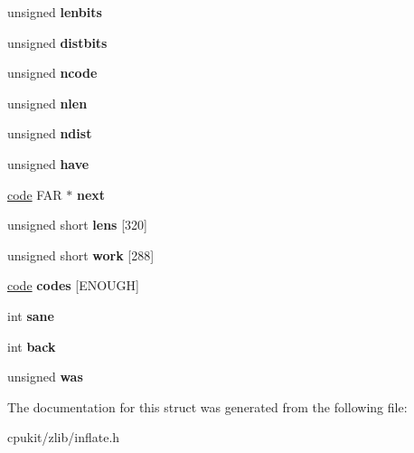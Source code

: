 \begin{DoxyCompactItemize}
unsigned {\bfseries lenbits}
\item 
\mbox{\label{structinflate__state_a98952f3f8f420a05b567f080aca0eb4b}} 
unsigned {\bfseries distbits}
\item 
\mbox{\label{structinflate__state_a62b5ea8559856b315b6c89d9114c2109}} 
unsigned {\bfseries ncode}
\item 
\mbox{\label{structinflate__state_a489b005f4fe214353cd80b77b4f23194}} 
unsigned {\bfseries nlen}
\item 
\mbox{\label{structinflate__state_a4415e5e51efdd0c8672e4c601caa4762}} 
unsigned {\bfseries ndist}
\item 
\mbox{\label{structinflate__state_a4a2b15912256bcf7b39980e15095ba58}} 
unsigned {\bfseries have}
\item 
\mbox{\label{structinflate__state_a872bf267d91efb4143e9cfb812e670bb}} 
\mbox{\hyperlink{structcode}{code}} F\+AR $\ast$ {\bfseries next}
\item 
\mbox{\label{structinflate__state_aa0620e64487c48635f6c3a11a0aeb99d}} 
unsigned short {\bfseries lens} \mbox{[}320\mbox{]}
\item 
\mbox{\label{structinflate__state_a85403907f7f5b9d355821ffa2591456c}} 
unsigned short {\bfseries work} \mbox{[}288\mbox{]}
\item 
\mbox{\label{structinflate__state_af9581f523a7d8d47fba6cdd73eaf1edc}} 
\mbox{\hyperlink{structcode}{code}} {\bfseries codes} \mbox{[}E\+N\+O\+U\+GH\mbox{]}
\item 
\mbox{\label{structinflate__state_a98b40fe23b7177bc8cd1d9d73edad593}} 
int {\bfseries sane}
\item 
\mbox{\label{structinflate__state_ab666ce74a806fc77200ced9bc385cb0b}} 
int {\bfseries back}
\item 
\mbox{\label{structinflate__state_a0e3af9175f6d3b30f83af69062ba4dec}} 
unsigned {\bfseries was}
\end{DoxyCompactItemize}


The documentation for this struct was generated from the following file\+:\begin{DoxyCompactItemize}
\item 
cpukit/zlib/inflate.\+h\end{DoxyCompactItemize}
